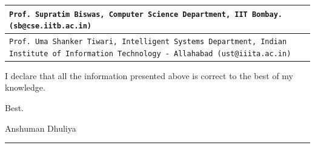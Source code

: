 \documentclass[a4paper,12pt]{article}
\begin{document}
\begin{flushleft}
\begin{tabular}{ m{} M{0.05\textwidth}}

    \rule[13pt]{0ex}{0ex}\texttt{Prof. Supratim Biswas, Computer Science Department, IIT Bombay. (sb@cse.iitb.ac.in)} & \\ \hline

    \rule[13pt]{0ex}{0ex}\texttt{Prof. Uma Shanker Tiwari, Intelligent Systems Department,
    Indian Institute of Information Technology - Allahabad (ust@iiita.ac.in)} & \\ \hline

\end{tabular}

\vspace{2em}
I declare that all the information presented above is correct
to the best of my knowledge.

\vspace{2em}

Best.

\vspace{2em}
Anshuman Dhuliya


\vspace*{\fill}
\rule[1pt]{\textwidth}{2pt}

\end{flushleft}
\end{document}
